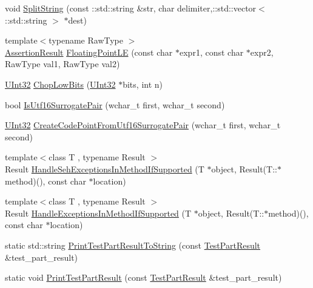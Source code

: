 \begin{DoxyCompactItemize}
\item 
void \hyperlink{namespacetesting_1_1internal_aa013dc1d62981cbad93c2fffa0192921}{Split\+String} (const \+::std\+::string \&str, char delimiter,\+::std\+::vector$<$ \+::std\+::string $>$ $\ast$dest)
\item 
{\footnotesize template$<$typename Raw\+Type $>$ }\\\hyperlink{classtesting_1_1AssertionResult}{Assertion\+Result} \hyperlink{namespacetesting_1_1internal_a17b52b6b1f81f6dcad5cc4d12e5173a6}{Floating\+Point\+LE} (const char $\ast$expr1, const char $\ast$expr2, Raw\+Type val1, Raw\+Type val2)
\item 
\hyperlink{namespacetesting_1_1internal_a40d4fffcd2bf56f18b1c380615aa85e3}{U\+Int32} \hyperlink{namespacetesting_1_1internal_a2c54b453387aa8a18f2f3e09f10b5a7d}{Chop\+Low\+Bits} (\hyperlink{namespacetesting_1_1internal_a40d4fffcd2bf56f18b1c380615aa85e3}{U\+Int32} $\ast$bits, int n)
\item 
bool \hyperlink{namespacetesting_1_1internal_a681895f8cc32286211be9889da107394}{Is\+Utf16\+Surrogate\+Pair} (wchar\+\_\+t first, wchar\+\_\+t second)
\item 
\hyperlink{namespacetesting_1_1internal_a40d4fffcd2bf56f18b1c380615aa85e3}{U\+Int32} \hyperlink{namespacetesting_1_1internal_ac8ef1bb10cd9e69de939789b759e6bc9}{Create\+Code\+Point\+From\+Utf16\+Surrogate\+Pair} (wchar\+\_\+t first, wchar\+\_\+t second)
\item 
{\footnotesize template$<$class T , typename Result $>$ }\\Result \hyperlink{namespacetesting_1_1internal_ac5293b438139ef7ed05cb7fcaaf63545}{Handle\+Seh\+Exceptions\+In\+Method\+If\+Supported} (T $\ast$object, Result(T\+::$\ast$method)(), const char $\ast$location)
\item 
{\footnotesize template$<$class T , typename Result $>$ }\\Result \hyperlink{namespacetesting_1_1internal_addb2ed165b92b74e25fe9ebe9e46b9f9}{Handle\+Exceptions\+In\+Method\+If\+Supported} (T $\ast$object, Result(T\+::$\ast$method)(), const char $\ast$location)
\item 
static std\+::string \hyperlink{namespacetesting_1_1internal_ada13cbf91139f0809a5a31ea2594c1ad}{Print\+Test\+Part\+Result\+To\+String} (const \hyperlink{classtesting_1_1TestPartResult}{Test\+Part\+Result} \&test\+\_\+part\+\_\+result)
\item 
static void \hyperlink{namespacetesting_1_1internal_ac844b3d05dd6f665f72e2a1cec1872ba}{Print\+Test\+Part\+Result} (const \hyperlink{classtesting_1_1TestPartResult}{Test\+Part\+Result} \&test\+\_\+part\+\_\+result)

\end{DoxyCompactItemize}
